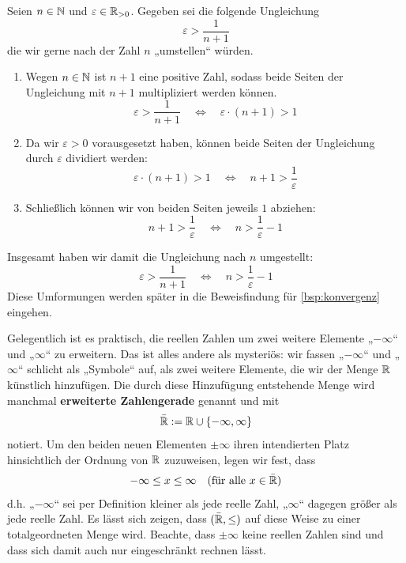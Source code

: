 \begin{bsp}
    Seien $n\in \mathbb N$ und $\varepsilon \in \mathbb R_{>0}$. Gegeben sei die folgende Ungleichung
        \[ \varepsilon > \frac{1}{n+1} \]
    die wir gerne nach der Zahl $n$ „umstellen“ würden.
    \begin{enumerate}
        \item Wegen $n\in \mathbb N$ ist $n+1$ eine positive Zahl, sodass beide Seiten der Ungleichung mit $n+1$ multipliziert werden können.
            \[ \varepsilon  > \frac{1}{n+1} \quad\iff\quad \varepsilon \cdot (n+1) > 1\]
        \item Da wir $\varepsilon>0$ vorausgesetzt haben, können beide Seiten der Ungleichung durch $\varepsilon$ dividiert werden:
            \[ \varepsilon \cdot (n+1) > 1 \quad\iff\quad n+1 > \frac{1}{\varepsilon} \]
        \item Schließlich können wir von beiden Seiten jeweils $1$ abziehen:
            \[ n+1 > \frac{1}{\varepsilon} \quad\iff\quad n > \frac{1}{\varepsilon}-1 \]
    \end{enumerate}
    Insgesamt haben wir damit die Ungleichung nach $n$ umgestellt:
        \[ \varepsilon > \frac{1}{n+1} \quad\iff\quad n > \frac{1}{\varepsilon}-1 \]
    Diese Umformungen werden später in die Beweisfindung für \cref{bsp:konvergenz} eingehen.
\end{bsp}


\begin{de} 
    Gelegentlich ist es praktisch, die reellen Zahlen um zwei weitere Elemente „$-\infty$“ und „$\infty$“ zu erweitern. Das ist alles andere als mysteriös: wir fassen „$-\infty$“ und „$\infty$“ schlicht als „Symbole“ auf, als zwei weitere Elemente, die wir der Menge $\mathbb R$ künstlich hinzufügen. Die durch diese Hinzufügung entstehende Menge wird manchmal \textbf{erweiterte Zahlengerade} genannt und mit
        \[ \bar{\mathbb R} := \mathbb R\cup \{-\infty,\infty\} \]
    notiert. Um den beiden neuen Elementen $\pm \infty$ ihren intendierten Platz hinsichtlich der Ordnung von $\mathbb R$ zuzuweisen, legen wir fest, dass
        \begin{align*}
            -\infty \le  x \le \infty && (\text{für alle $x\in \bar {\mathbb R}$})
        \end{align*}
    d.h. „$-\infty$“ sei per Definition kleiner als jede reelle Zahl, „$\infty$“ dagegen größer als jede reelle Zahl. Es lässt sich zeigen, dass $(\bar {\mathbb R},\le)$ auf diese Weise zu einer totalgeordneten Menge wird. Beachte, dass $\pm \infty$ keine reellen Zahlen sind und dass sich damit auch nur eingeschränkt rechnen lässt.
\end{de}


